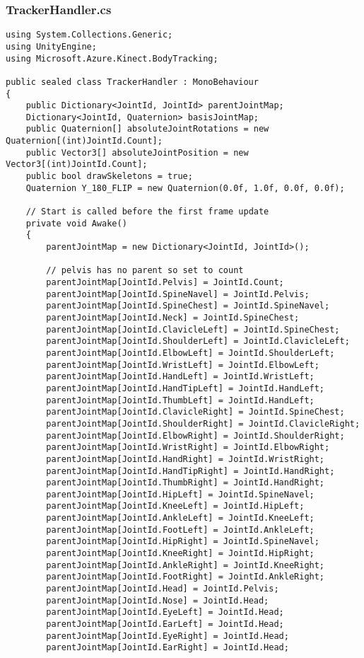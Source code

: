 \subsubsection*{TrackerHandler.cs}
\begin{verbatim}
﻿using System.Collections.Generic;
using UnityEngine;
using Microsoft.Azure.Kinect.BodyTracking;

public sealed class TrackerHandler : MonoBehaviour
{
    public Dictionary<JointId, JointId> parentJointMap;
    Dictionary<JointId, Quaternion> basisJointMap;
    public Quaternion[] absoluteJointRotations = new Quaternion[(int)JointId.Count];
    public Vector3[] absoluteJointPosition = new Vector3[(int)JointId.Count];
    public bool drawSkeletons = true;
    Quaternion Y_180_FLIP = new Quaternion(0.0f, 1.0f, 0.0f, 0.0f);

    // Start is called before the first frame update
    private void Awake()
    {
        parentJointMap = new Dictionary<JointId, JointId>();

        // pelvis has no parent so set to count
        parentJointMap[JointId.Pelvis] = JointId.Count;
        parentJointMap[JointId.SpineNavel] = JointId.Pelvis;
        parentJointMap[JointId.SpineChest] = JointId.SpineNavel;
        parentJointMap[JointId.Neck] = JointId.SpineChest;
        parentJointMap[JointId.ClavicleLeft] = JointId.SpineChest;
        parentJointMap[JointId.ShoulderLeft] = JointId.ClavicleLeft;
        parentJointMap[JointId.ElbowLeft] = JointId.ShoulderLeft;
        parentJointMap[JointId.WristLeft] = JointId.ElbowLeft;
        parentJointMap[JointId.HandLeft] = JointId.WristLeft;
        parentJointMap[JointId.HandTipLeft] = JointId.HandLeft;
        parentJointMap[JointId.ThumbLeft] = JointId.HandLeft;
        parentJointMap[JointId.ClavicleRight] = JointId.SpineChest;
        parentJointMap[JointId.ShoulderRight] = JointId.ClavicleRight;
        parentJointMap[JointId.ElbowRight] = JointId.ShoulderRight;
        parentJointMap[JointId.WristRight] = JointId.ElbowRight;
        parentJointMap[JointId.HandRight] = JointId.WristRight;
        parentJointMap[JointId.HandTipRight] = JointId.HandRight;
        parentJointMap[JointId.ThumbRight] = JointId.HandRight;
        parentJointMap[JointId.HipLeft] = JointId.SpineNavel;
        parentJointMap[JointId.KneeLeft] = JointId.HipLeft;
        parentJointMap[JointId.AnkleLeft] = JointId.KneeLeft;
        parentJointMap[JointId.FootLeft] = JointId.AnkleLeft;
        parentJointMap[JointId.HipRight] = JointId.SpineNavel;
        parentJointMap[JointId.KneeRight] = JointId.HipRight;
        parentJointMap[JointId.AnkleRight] = JointId.KneeRight;
        parentJointMap[JointId.FootRight] = JointId.AnkleRight;
        parentJointMap[JointId.Head] = JointId.Pelvis;
        parentJointMap[JointId.Nose] = JointId.Head;
        parentJointMap[JointId.EyeLeft] = JointId.Head;
        parentJointMap[JointId.EarLeft] = JointId.Head;
        parentJointMap[JointId.EyeRight] = JointId.Head;
        parentJointMap[JointId.EarRight] = JointId.Head;


\end{verbatim}
